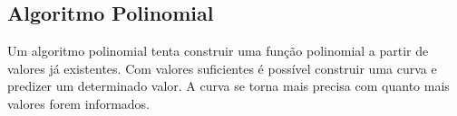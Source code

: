 \documentclass[12pt]{article}
\begin{document}
\subsection{Algoritmo Polinomial}
Um algoritmo polinomial tenta construir uma função polinomial a partir de
valores já existentes. Com valores suficientes é possível construir uma curva
e predizer um determinado valor. A curva se torna mais precisa com quanto mais
valores forem informados.



%
\end{document}
